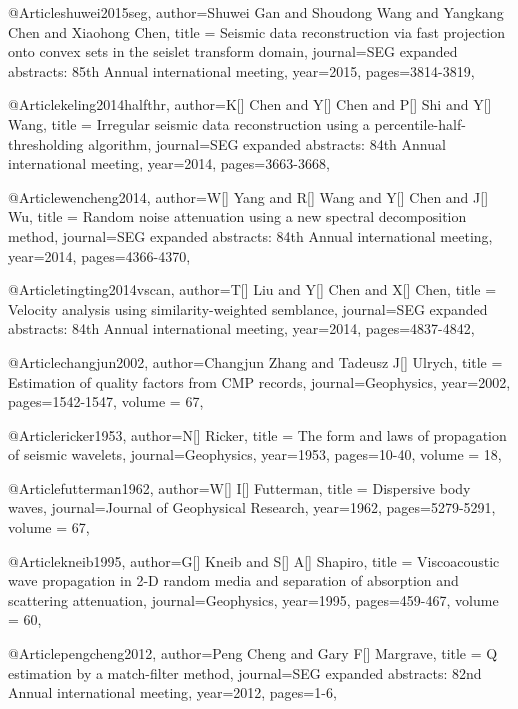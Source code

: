 {@Article{shuwei2015seg,
  author={Shuwei Gan and Shoudong Wang and Yangkang Chen and Xiaohong Chen},
  title = {Seismic data reconstruction via fast projection onto convex sets in the seislet transform domain},
  journal={SEG expanded abstracts: 85th Annual international meeting},
  year=2015,
  pages={3814-3819},
}

@Article{keling2014halfthr,
  author={K[] Chen and Y[] Chen and P[] Shi and Y[] Wang},
  title = {Irregular seismic data reconstruction using a percentile-half-thresholding algorithm},
  journal={SEG expanded abstracts: 84th Annual international meeting},
  year=2014,
  pages={3663-3668},
}






@Article{wencheng2014,
  author={W[] Yang and R[] Wang and Y[] Chen and J[] Wu},
  title = {Random noise attenuation using a new spectral decomposition method},
  journal={SEG expanded abstracts: 84th Annual international meeting},
  year=2014,
  pages={4366-4370},
}





@Article{tingting2014vscan,
  author={T[] Liu and Y[] Chen and X[] Chen},
  title = {Velocity analysis using similarity-weighted semblance},
  journal={SEG expanded abstracts: 84th Annual international meeting},
  year=2014,
  pages={4837-4842},
}

@Article{changjun2002,
  author={Changjun Zhang and Tadeusz J[] Ulrych},
  title = {Estimation of quality factors from CMP records},
  journal={Geophysics},
  year=2002,
  pages={1542-1547},
  volume = 67,
}

@Article{ricker1953,
  author={N[] Ricker},
  title = {The form and laws of propagation of seismic wavelets},
  journal={Geophysics},
  year=1953,
  pages={10-40},
  volume = 18,
}

@Article{futterman1962,
  author={W[] I[] Futterman},
  title = {Dispersive body waves},
  journal={Journal of Geophysical Research},
  year=1962,
  pages={5279-5291},
  volume = 67,
}

@Article{kneib1995,
  author={G[] Kneib and S[] A[] Shapiro},
  title = {Viscoacoustic wave propagation in 2-D random media and separation of absorption and scattering attenuation},
  journal={Geophysics},
  year=1995,
  pages={459-467},
  volume = 60,
}

@Article{pengcheng2012,
  author={Peng Cheng and Gary F[] Margrave},
  title = {Q estimation by a match-filter method},
  journal={SEG expanded abstracts: 82nd Annual international meeting},
  year=2012,
  pages={1-6},
}

}
